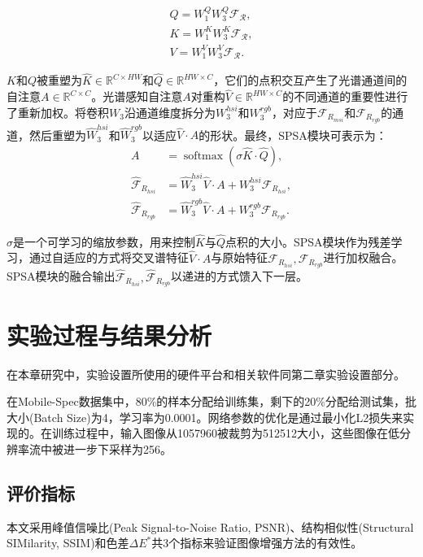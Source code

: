 \documentclass[
    type = master, %
    degree = academic,        %
    decl-page,  %
  ]{njuthesis}
\begin{document}
\begin{equation}
\begin{align}
Q=W_1^Q W_3^Q \mathcal{F}_{\mathcal{R}},\\
K=W_1^K W_3^K \mathcal{F}_{\mathcal{R}},\\
V=W_1^V W_3^V \mathcal{F}_{\mathcal{R}}.
\end{align}
\end{equation}

$K$和$Q$被重塑为$\hat{K} \in \mathbb{R}^{C \times HW}$和$\hat{Q} \in \mathbb{R}^{H W \times C}$，它们的点积交互产生了光谱通道间的自注意$A \in \mathbb{R}^{C \times C}$。光谱感知自注意$A$对重构$\hat{V} \in \mathbb{R}^{H W \times C}$的不同通道的重要性进行了重新加权。将卷积$W_3$沿通道维度拆分为${W}_3^{hsi}$和${W}_3^{r g b}$，对应于$\mathcal{F}_{R_{msi}}$和$\mathcal{F}_{R_{rgb}}$的通道，然后重塑为$\hat{W}_3^{hsi}$和$\hat{W}_3^{r g b}$以适应$\hat{V} \cdot A$的形状。最终，SPSA模块可表示为：
\begin{equation}
\begin{aligned}
A & =\operatorname{softmax}(\sigma \hat{K} \cdot \hat{Q}), \\
\hat{\mathcal{F}}_{R_{hsi}} & =\hat{W}_3^{hsi} \hat{V} \cdot A+W_3^{hsi} \mathcal{F}_{R_{hsi}}, \\
\hat{\mathcal{F}}_{R_{r g b}} & =\hat{W}_3^{r g b} \hat{V} \cdot A+W_3^{r g b} \mathcal{F}_{R_{r g b}}.
\end{aligned}
\end{equation}

$σ$是一个可学习的缩放参数，用来控制$\hat{K}$与$\hat{Q}$点积的大小。SPSA模块作为残差学习，通过自适应的方式将交叉谱特征$\hat{V} \cdot A$与原始特征$\mathcal{F}_{R_{hsi}}, \mathcal{F}_{R_{r g b}}$进行加权融合。 SPSA模块的融合输出$\hat{\mathcal{F}}_{R_{hsi}}, \hat{\mathcal{F}}_{R_{r g b}}$以递进的方式馈入下一层。

\section{实验过程与结果分析}
在本章研究中，实验设置所使用的硬件平台和相关软件同第二章实验设置部分。

在Mobile-Spec数据集中，80\%的样本分配给训练集，剩下的20\%分配给测试集，批大小(Batch Size)为4，学习率为0.0001。网络参数的优化是通过最小化L2损失来实现的。在训练过程中，输入图像从1057\times960被裁剪为512\times512大小，这些图像在低分辨率流中被进一步下采样为256。
\subsection{评价指标}
本文采用峰值信噪比(Peak Signal-to-Noise Ratio, PSNR)、结构相似性(Structural SIMilarity, SSIM)\cite{J34}和色差$\Delta E^*$共3个指标来验证图像增强方法的有效性。
\end{document}
